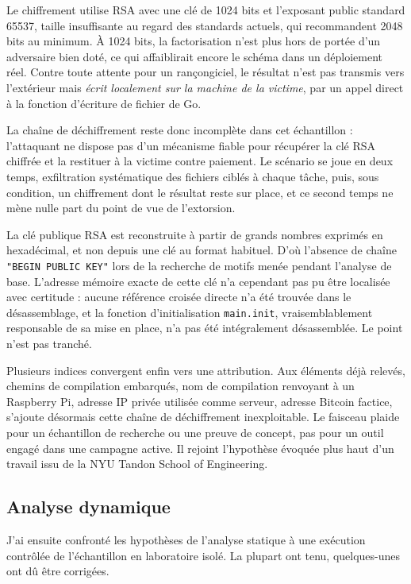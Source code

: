 Le chiffrement utilise RSA avec une clé de 1024 bits et l'exposant public standard 65537, taille insuffisante au regard des standards actuels, qui recommandent 2048 bits au minimum. À 1024 bits, la factorisation n'est plus hors de portée d'un adversaire bien doté, ce qui affaiblirait encore le schéma dans un déploiement réel. Contre toute attente pour un rançongiciel, le résultat n'est pas transmis vers l'extérieur mais \emph{écrit localement sur la machine de la victime}, par un appel direct à la fonction d'écriture de fichier de Go.

La chaîne de déchiffrement reste donc incomplète dans cet échantillon : l'attaquant ne dispose pas d'un mécanisme fiable pour récupérer la clé RSA chiffrée et la restituer à la victime contre paiement. Le scénario se joue en deux temps, exfiltration systématique des fichiers ciblés à chaque tâche, puis, sous condition, un chiffrement dont le résultat reste sur place, et ce second temps ne mène nulle part du point de vue de l'extorsion.

La clé publique RSA est reconstruite à partir de grands nombres exprimés en hexadécimal, et non depuis une clé au format habituel. D'où l'absence de chaîne \texttt{"BEGIN PUBLIC KEY"} lors de la recherche de motifs menée pendant l'analyse de base. L'adresse mémoire exacte de cette clé n'a cependant pas pu être localisée avec certitude : aucune référence croisée directe n'a été trouvée dans le désassemblage, et la fonction d'initialisation \texttt{main.init}, vraisemblablement responsable de sa mise en place, n'a pas été intégralement désassemblée. Le point n'est pas tranché.

Plusieurs indices convergent enfin vers une attribution. Aux éléments déjà relevés, chemins de compilation embarqués, nom de compilation renvoyant à un Raspberry Pi, adresse IP privée utilisée comme serveur, adresse Bitcoin factice, s'ajoute désormais cette chaîne de déchiffrement inexploitable. Le faisceau plaide pour un échantillon de recherche ou une preuve de concept, pas pour un outil engagé dans une campagne active. Il rejoint l'hypothèse évoquée plus haut d'un travail issu de la NYU Tandon School of Engineering.

\subsection{Analyse dynamique}
\label{subsec:analyse-dynamique}

J'ai ensuite confronté les hypothèses de l'analyse statique à une exécution contrôlée de l'échantillon en laboratoire isolé. La plupart ont tenu, quelques-unes ont dû être corrigées.

